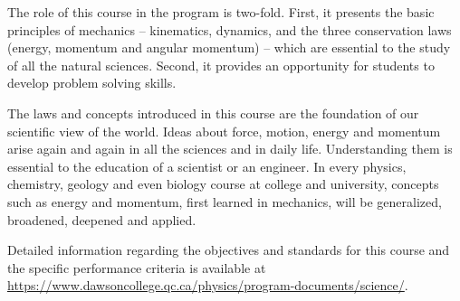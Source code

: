 {The role of this course in the program is two-fold. First, it presents the basic principles of mechanics -- kinematics, dynamics, and the three conservation laws (energy, momentum and angular momentum) -- which are essential to the study of all the natural sciences. Second, it provides an opportunity for students to develop problem solving skills.
\smallskip

The laws and concepts introduced in this course are the foundation of our scientific view of the world. Ideas about force, motion, energy and momentum arise again and again in all the sciences and in daily life. Understanding them is essential to the education of a scientist or an engineer. In every physics, chemistry, geology and even biology course at college and university, concepts such as energy and momentum, first learned in mechanics, will be generalized, broadened, deepened and applied.
\smallskip

Detailed information regarding the objectives and standards for this course and the specific performance criteria is available at \url{https://www.dawsoncollege.qc.ca/physics/program-documents/science/}.}
